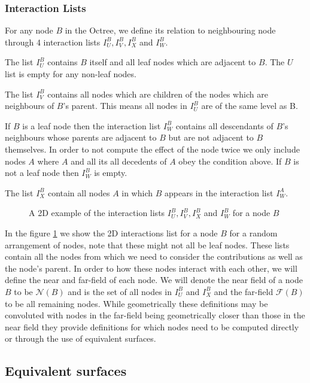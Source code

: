 \subsubsection{Interaction Lists}
For any node $B$ in the Octree, we define its relation to neighbouring node through 4 interaction lists $I_U^B, I_V^B, I_X^B$ and $I_W^B$. 

The list $I^B_U$ contains $B$ itself and all leaf nodes which are adjacent to $B$. The $U$ list is empty for any non-leaf nodes.

The list $I_V^B$ contains all nodes which are children of the nodes which are neighbours of $B$'s parent. This means all nodes in $I_U^B$ are of the same level as B.

If $B$ is a leaf node then the interaction list $I_W^B$ contains all descendants of $B$'s neighbours whose parents are adjacent to $B$ but are not adjacent to $B$ themselves. In order to not compute the effect of the node twice we only include nodes $A$ where $A$ and all its all decedents of $A$ obey the condition above. If $B$ is not a leaf node then $I_W^B$ is empty.

The list $I_X^B$ contain all nodes $A$ in which $B$ appears in the interaction list $I_W^A$.

\begin{figure}[ht]
    \centering
    
    \caption{A 2D example of the interaction lists $I_U^B, I_V^B, I_X^B$ and $I_W^B$ for a node $B$}
    \label{fig:InteractionsLists}
\end{figure}


In the figure \ref{fig:InteractionsLists} we show the 2D interactions list for a node $B$ for a random arrangement of nodes, note that these might not all be leaf nodes. These lists contain all the nodes from which we need to consider the contributions as well as the node's parent. In order to how these nodes interact with each other, we will define the near and far-field of each node. We will denote the near field of a node $B$ to be $\mathcal{N}(B)$ and is the set of all nodes in $I_U^B$ and $I_X^B$ and the far-field $\mathcal{F}(B)$ to be all remaining nodes. While geometrically these definitions may be convoluted with nodes in the far-field being geometrically closer than those in the near field they provide definitions for which nodes need to be computed directly or through the use of equivalent surfaces.

\subsection{Equivalent surfaces}

